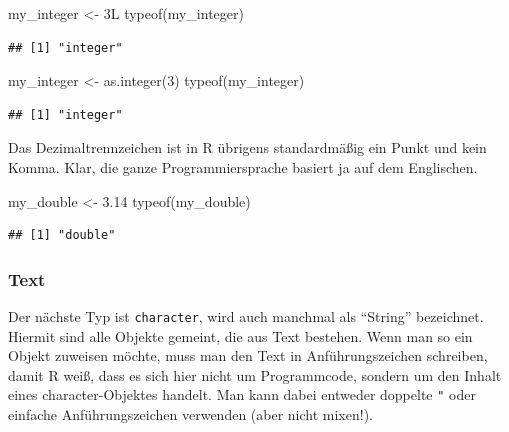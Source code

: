 \documentclass[
]{book}
\newenvironment{Shaded}{\begin{snugshade}}{\end{snugshade}}
\newcommand{\DecValTok}[1]{\textcolor[rgb]{0.00,0.00,0.81}{#1}}
\newcommand{\FloatTok}[1]{\textcolor[rgb]{0.00,0.00,0.81}{#1}}
\newcommand{\FunctionTok}[1]{\textcolor[rgb]{0.00,0.00,0.00}{#1}}
\newcommand{\NormalTok}[1]{#1}
\newcommand{\OtherTok}[1]{\textcolor[rgb]{0.56,0.35,0.01}{#1}}
\begin{document}
\begin{Shaded}
\begin{Highlighting}[]
\NormalTok{my\_integer }\OtherTok{\textless{}{-}}\NormalTok{ 3L}
\FunctionTok{typeof}\NormalTok{(my\_integer)}
\end{Highlighting}
\end{Shaded}

\begin{verbatim}
## [1] "integer"
\end{verbatim}

\begin{Shaded}
\begin{Highlighting}[]
\NormalTok{my\_integer }\OtherTok{\textless{}{-}} \FunctionTok{as.integer}\NormalTok{(}\DecValTok{3}\NormalTok{)}
\FunctionTok{typeof}\NormalTok{(my\_integer)}
\end{Highlighting}
\end{Shaded}

\begin{verbatim}
## [1] "integer"
\end{verbatim}

Das Dezimaltrennzeichen ist in R übrigens standardmäßig ein Punkt und kein Komma. Klar, die ganze Programmiersprache basiert ja auf dem Englischen.

\begin{Shaded}
\begin{Highlighting}[]
\NormalTok{my\_double }\OtherTok{\textless{}{-}} \FloatTok{3.14}
\FunctionTok{typeof}\NormalTok{(my\_double)}
\end{Highlighting}
\end{Shaded}

\begin{verbatim}
## [1] "double"
\end{verbatim}

\hypertarget{text}{%
\subsubsection{Text}\label{text}}

Der nächste Typ ist \texttt{character}, wird auch manchmal als ``String'' bezeichnet. Hiermit sind alle Objekte gemeint, die aus Text bestehen. Wenn man so ein Objekt zuweisen möchte, muss man den Text in Anführungszeichen schreiben, damit R weiß, dass es sich hier nicht um Programmcode, sondern um den Inhalt eines character-Objektes handelt. Man kann dabei entweder doppelte \texttt{"} oder einfache \texttt{\textquotesingle{}} Anführungszeichen verwenden (aber nicht mixen!).
\end{document}
